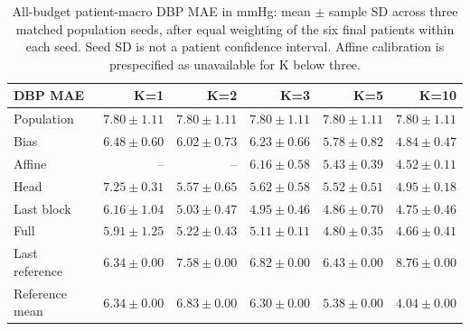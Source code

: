 \documentclass[11pt]{article}
\begin{document}
\begin{table}[!htbp]\centering\small
\begin{tabular}{lrrrrr}\toprule
DBP MAE & K=1 & K=2 & K=3 & K=5 & K=10\\\midrule
Population & $7.80\pm1.11$ & $7.80\pm1.11$ & $7.80\pm1.11$ & $7.80\pm1.11$ & $7.80\pm1.11$\\
Bias & $6.48\pm0.60$ & $6.02\pm0.73$ & $6.23\pm0.66$ & $5.78\pm0.82$ & $4.84\pm0.47$\\
Affine & -- & -- & $6.16\pm0.58$ & $5.43\pm0.39$ & $4.52\pm0.11$\\
Head & $7.25\pm0.31$ & $5.57\pm0.65$ & $5.62\pm0.58$ & $5.52\pm0.51$ & $4.95\pm0.18$\\
Last block & $6.16\pm1.04$ & $5.03\pm0.47$ & $4.95\pm0.46$ & $4.86\pm0.70$ & $4.75\pm0.46$\\
Full & $5.91\pm1.25$ & $5.22\pm0.43$ & $5.11\pm0.11$ & $4.80\pm0.35$ & $4.66\pm0.41$\\
Last reference & $6.34\pm0.00$ & $7.58\pm0.00$ & $6.82\pm0.00$ & $6.43\pm0.00$ & $8.76\pm0.00$\\
Reference mean & $6.34\pm0.00$ & $6.83\pm0.00$ & $6.30\pm0.00$ & $5.38\pm0.00$ & $4.04\pm0.00$\\
\bottomrule\end{tabular}
\caption{All-budget patient-macro DBP MAE in mmHg: mean $\pm$ sample SD across three matched population seeds, after equal weighting of the six final patients within each seed. Seed SD is not a patient confidence interval. Affine calibration is prespecified as unavailable for K below three.}\end{table}
\end{document}
